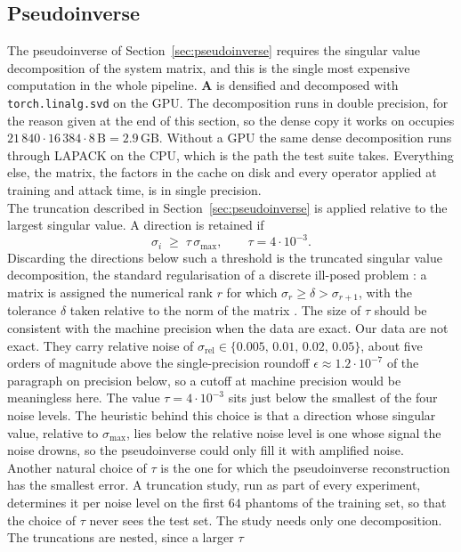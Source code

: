 \documentclass{article}
\numberwithin{equation}{section}
\begin{document}
\subsection{Pseudoinverse}\label{sec:pinv}
The pseudoinverse of Section~\ref{sec:pseudoinverse} requires the singular value decomposition of
the system matrix, and this is the single most expensive computation in the
whole pipeline. $\mathbf{A}$ is densified and decomposed with
\texttt{torch.linalg.svd} on the GPU\@. The decomposition runs in double precision, for the reason given at the end of this section,
so the dense copy it works on occupies
$21\,840\cdot16\,384\cdot8\,\text{B}=2.9$\,GB\@. Without a GPU the same dense
decomposition runs through LAPACK on the CPU, which is the path the test suite
takes. Everything else, the matrix, the factors in the cache on disk and every
operator applied at training and attack time, is in single precision.\\
The truncation described in Section~\ref{sec:pseudoinverse} is applied relative to the largest
singular value. A direction is retained if
\[\sigma_i\;\geq\;\tau\,\sigma_{\max},\qquad \tau = 4\cdot10^{-3}.\]
Discarding the directions below such a threshold is the truncated singular value
decomposition, the standard regularisation of a discrete ill-posed problem
\parencite{engl1996regularization}: a matrix is assigned the numerical rank $r$ for which $\sigma_r\geq\delta>\sigma_{r+1}$,
with the tolerance $\delta$ taken relative to the norm of the matrix \parencite{GolubVanLoan}.
The size of $\tau$ should be consistent with the machine precision when the data are exact.
Our data are not exact.
They carry relative noise of $\sigma_\text{rel}\in\{0.005,\,0.01,\,0.02,\,0.05\}$,
about five orders of magnitude above the single-precision roundoff
$\epsilon\approx1.2\cdot10^{-7}$ of the paragraph on precision below, so a
cutoff at machine precision would be meaningless here. The value $\tau=4\cdot10^{-3}$ sits
just below the smallest of the four noise levels. The heuristic behind this choice is that a
direction whose singular value, relative to $\sigma_{\max}$, lies below the relative noise level is
one whose signal the noise drowns, so the pseudoinverse could only fill it with amplified noise.\\
Another natural choice of $\tau$ is the one for which the pseudoinverse reconstruction has the
smallest error. A truncation study, run as part of every experiment, determines it per noise level
on the first $64$ phantoms of the training set, so that the choice of $\tau$ never sees the test
set. The study needs only one decomposition. The truncations are nested, since a larger $\tau$
\end{document}
